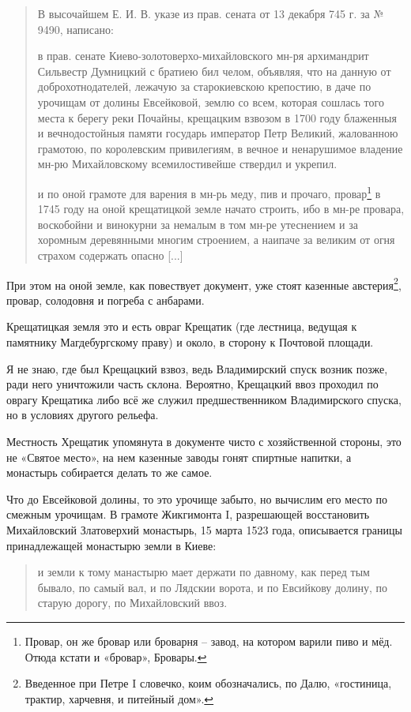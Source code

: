 \begin{quotation}
В высочайшем Е. И. В. указе из прав. сената от 13 декабря 745 г. за № 9490, написано: 

в прав. сенате Киево-золотоверхо-михайлов\-ского мн-ря архимандрит Сильвестр Думницкий с братиею бил челом, объявляя, что на данную от доброхотнодателей, лежачую за старокиевскою крепостию, в даче по урочищам от долины Евсейковой, землю со всем, которая сошлась того места к берегу реки Почайны, крещацким взвозом в 1700 году блаженныя и вечнодостойныя памяти государь император Петр Великий, жалованною грамотою, по королевским привилегиям, в вечное и ненарушимое владение мн-рю Михайловскому всемилостивейше ствердил и укрепил. 

и по оной грамоте для варения в мн-рь меду, пив и прочаго, провар\footnote{Провар, он же бровар или броварня – завод, на котором варили пиво и мёд. Отюда кстати и «бровар», Бровары.} в 1745 году на оной крещатицкой земле начато строить, ибо в мн-ре провара, воскобойни и винокурни за немалым в том мн-ре утеснением и за хоромным деревянными многим строением, а наипаче за великим от огня страхом содержать опасно [...]
\end{quotation}

При этом на оной земле, как повествует документ, уже стоят казенные австерия\footnote{Введенное при Петре I словечко, коим обозначались, по Далю, «гостиница, трактир, харчевня,  и  питейный дом».}, провар, солодовня и погреба с анбарами.

Крещатицкая земля это и есть овраг Крещатик (где лестница, ведущая к памятнику Магдебургскому праву) и около, в сторону к Почтовой площади. 

Я не знаю, где был Крещацкий взвоз, ведь Владимирский спуск возник позже, ради него уничтожили часть склона. Вероятно, Крещацкий ввоз проходил по оврагу Крещатика либо всё же служил предшественником Владимирского спуска, но в условиях другого рельефа.

Местность Хрещатик упомянута в документе чисто с хозяйственной стороны, это не «Святое место», на нем казенные заводы гонят спиртные напитки, а монастырь собирается делать то же самое.

Что до Евсейковой долины, то это урочище забыто, но вычислим его место по смежным урочищам. В грамоте Жикгимонта I, разрешающей восстановить Михайловский Златоверхий монастырь, 15 марта 1523 года, описывается границы принадлежащей монастырю земли в Киеве:

\begin{quotation}
и земли к тому манастырю мает держати по давному, как перед тым бывало, по самый вал, и по Лядскии ворота, и по Евсийкову долину, по старую дорогу, по Михайловский ввоз.
\end{quotation}

